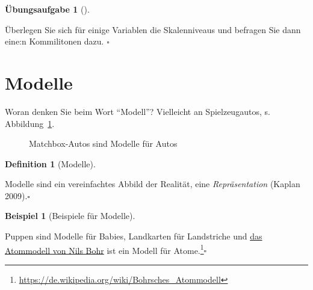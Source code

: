 \documentclass[
  a4paper,
  DIV=11]{scrreprt}
\theoremstyle{definition}
\newtheorem{exercise}{Übungsaufgabe}[chapter]
\theoremstyle{definition}
\newtheorem{example}{Beispiel}[chapter]
\theoremstyle{definition}
\newtheorem{definition}{Definition}[chapter]
\theoremstyle{remark}
\begin{document}
\begin{exercise}[]\protect\hypertarget{exr-skalenniveaus}{}\label{exr-skalenniveaus}

Überlegen Sie sich für einige Variablen die Skalenniveaus und befragen
Sie dann eine:n Kommilitonen dazu. \(\square\)

\end{exercise}

\section{Modelle}\label{modelle}

Woran denken Sie beim Wort ``Modell''? Vielleicht an Spielzeugautos, s.
Abbildung~\ref{fig-matchbox}.

\begin{figure}


\caption{\label{fig-matchbox}Matchbox-Autos sind Modelle für Autos}

\end{figure}%

\begin{definition}[Modelle]\protect\hypertarget{def-modelle}{}\label{def-modelle}

Modelle sind ein vereinfachtes Abbild der Realität, eine
\emph{Repräsentation} (Kaplan 2009).\(\square\)

\end{definition}

\begin{example}[Beispiele für
Modelle]\protect\hypertarget{exm-Modelle}{}\label{exm-Modelle}

Puppen sind Modelle für Babies, Landkarten für Landstriche und
\href{https://de.wikipedia.org/wiki/Bohrsches_Atommodell}{das Atommodell
von Nils Bohr} ist ein Modell für Atome.\footnote{\url{https://de.wikipedia.org/wiki/Bohrsches_Atommodell}}\(\square\)

\end{example}
\end{document}
